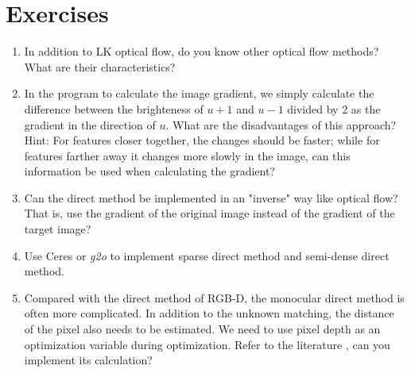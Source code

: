 \section*{Exercises}
\begin{enumerate}
	\item In addition to LK optical flow, do you know other optical flow methods? What are their characteristics?
	\item In the program to calculate the image gradient, we simply calculate the difference between the brighteness of $u+1$ and $u-1$ divided by 2 as the gradient in the direction of $u$. What are the disadvantages of this approach? Hint: For features closer together, the changes should be faster; while for features farther away it changes more slowly in the image, can this information be used when calculating the gradient?
	\item Can the direct method be implemented in an "inverse" way like optical flow? That is, use the gradient of the original image instead of the gradient of the target image?
	\item[\optional] Use Ceres or \textit{g2o} to implement sparse direct method and semi-dense direct method.
	\item Compared with the direct method of RGB-D, the monocular direct method is often more complicated. In addition to the unknown matching, the distance of the pixel also needs to be estimated. We need to use pixel depth as an optimization variable during optimization. Refer to the literature \cite{Engel2013, Engel2014}, can you implement its calculation?
\end{enumerate}


